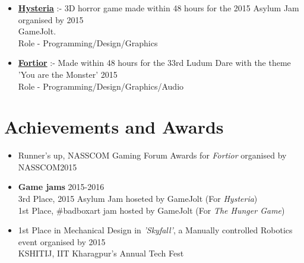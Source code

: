 \documentclass[margin, centered]{res}
\begin{document}
\begin{resume}
\begin{itemize}[leftmargin=*]
	\item \textbf{\href{http://gamejolt.com/games/hysteria/107191}{Hysteria}} :- 3D horror game made within 48 hours for the 2015 Asylum Jam organised by \hfill 2015 \\GameJolt. \\Role - Programming/Design/Graphics
	\item \textbf{\href{http://gamejolt.com/games/fortior/88093}{Fortior}} :- Made within 48 hours for the 33rd Ludum Dare with the theme 'You are the Monster' \hfill 2015
	\\Role - Programming/Design/Graphics/Audio
\end{itemize}

\section{Achievements and Awards}
\begin{itemize}[leftmargin=*]
\item Runner's up, NASSCOM Gaming Forum Awards for \textit{Fortior} organised by NASSCOM\hfill 2015
\item \textbf{Game jams} \hfill 2015-2016
\\
3rd Place, 2015 Asylum Jam hoseted by GameJolt (For \textit{Hysteria})\\
1st Place, \#badboxart jam hosted by GameJolt (For \textit{The Hunger Game})
\item 1st Place in Mechanical Design in \textit{'Skyfall'}, a Manually controlled Robotics event organised by \hfill2015 \\ KSHITIJ, IIT Kharagpur's Annual Tech Fest
\end{itemize}

\end{resume}
\end{document}
